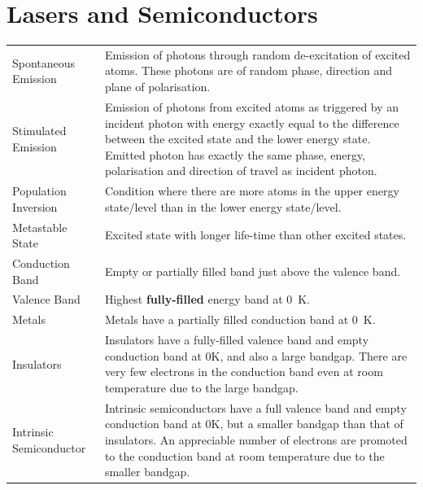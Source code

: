 \documentclass[a4paper,11pt]{article}
\begin{document}
	\section{Lasers and Semiconductors}
	\begin{center}
		\renewcommand{\arraystretch}{1.8}
		\begin{tabular}{@{} l p{10cm} @{}}
			\toprule
			Spontaneous Emission & Emission of photons through random de-excitation of excited atoms. These photons are of random phase, direction and plane of polarisation.\\
			Stimulated Emission & Emission of photons from excited atoms as triggered by an incident photon with energy exactly equal to the difference between the excited state and the lower energy state. Emitted photon has exactly the same phase, energy, polarisation and direction of travel as incident photon.\\
			Population Inversion & Condition where there are more atoms in the upper energy state/level than in the lower energy state/level.\\
			Metastable State & Excited state with longer life-time than other excited states.\\
			Conduction Band & Empty or partially filled band just above the valence band.\\
			Valence Band & Highest \textbf{fully-filled} energy band at \SI{0}{\kelvin}.\\
			Metals & Metals have a partially filled conduction band at \SI{0}{\kelvin}.\\
			Insulators & Insulators have a fully-filled valence band and empty conduction band at 0K, and also a large bandgap. There are very few electrons in the conduction band even at room temperature due to the large bandgap.\\
			Intrinsic Semiconductor & Intrinsic semiconductors have a full valence band and empty conduction band at 0K, but a smaller bandgap than that of insulators. An appreciable number of electrons are promoted to the conduction band at room temperature due to the smaller bandgap.\\
			\bottomrule
		\end{tabular}
	\end{center}
	\newpage
\end{document}
